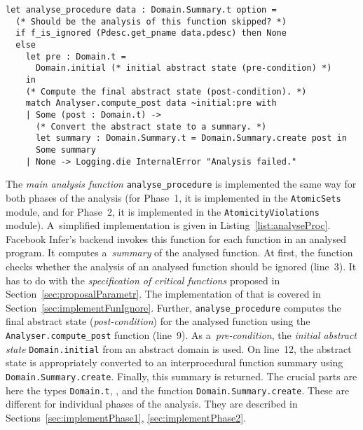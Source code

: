 \begin{lstlisting}[style=ocaml, label={list:analyseProc}, float=hbt, caption={The \emph{main analysis function} for analysing individual functions in a~given program}]
let analyse_procedure data : Domain.Summary.t option =
  (* Should be the analysis of this function skipped? *)
  if f_is_ignored (Pdesc.get_pname data.pdesc) then None
  else
    let pre : Domain.t = 
      Domain.initial (* initial abstract state (pre-condition) *)
    in
    (* Compute the final abstract state (post-condition). *)
    match Analyser.compute_post data ~initial:pre with
    | Some (post : Domain.t) ->
      (* Convert the abstract state to a summary. *)
      let summary : Domain.Summary.t = Domain.Summary.create post in
      Some summary
    | None -> Logging.die InternalError "Analysis failed."
\end{lstlisting}

The \emph{main analysis function} \texttt{analyse\_procedure} is implemented the same way for both phases of the analysis (for Phase~1, it is implemented in the \texttt{AtomicSets} module, and for Phase~2, it is implemented in the \texttt{AtomicityViolations} module). A~simplified implementation is given in Listing~\ref{list:analyseProc}. Facebook Infer's backend invokes this function for each function in an analysed program. It computes a~\emph{summary} of the analysed function. At first, the function checks whether the analysis of an analysed function should be ignored (line~3). It has to do with the \emph{specification of critical functions} proposed in Section~\ref{sec:proposalParametr}. The implementation of that is covered in Section~\ref{sec:implementFunIgnore}. Further, \texttt{analyse\_procedure} computes the final abstract state (\emph{post-condition}) for the analysed function using the \texttt{Analyser.compute\_post} function (line~9). As a~\emph{pre-condition}, the \emph{initial abstract state} \texttt{Domain.initial} from an abstract domain is used. On line~12, the abstract state is appropriately converted to an interprocedural function summary using \texttt{Domain.Summary.create}. Finally, this summary is returned. The crucial parts are here the types \texttt{Domain.t}, , and the function \texttt{Domain.Summary.create}. These are different for individual phases of the analysis. They are described in Sections~\ref{sec:implementPhase1}, \ref{sec:implementPhase2}.

